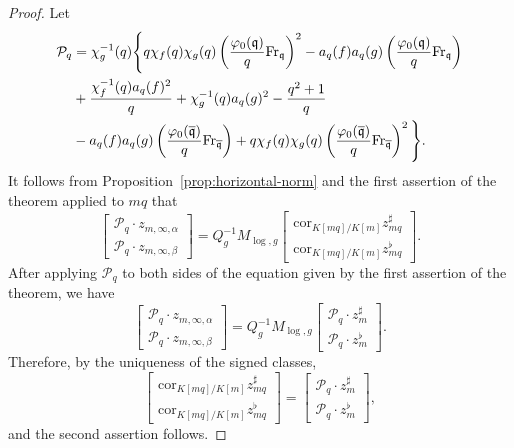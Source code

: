 \documentclass{amsart}
\numberwithin{equation}{section}
\newcommand{\frk}{\mathfrak}
\newcommand{\cP}{\mathcal{P}}
\newcommand{\cor}{\mathrm{cor}}
\newcommand{\Fr}{{\rm Fr}}
\begin{document}
\begin{proof}
    Let
     \begin{align*}
        \cP_q &= \chi_g^{-1}(q)\Bigg\{ q\chi_f(q)\chi_g(q) \left(\frac{\varphi_0(\frk{q})}{q}\Fr_{\frk{q}}\right)^2 -a_q(f)a_q(g) \left(\frac{\varphi_0(\frk{q})}{q}\Fr_{\frk{q}}\right) \\
        & +\frac{\chi_f^{-1}(q)a_q(f)^2}{q}+ \chi_{g}^{-1}(q)a_{q}(g)^2-\frac{q^2+1}{q} \\
        &-a_q(f)a_q(g) \left(\frac{\varphi_0(\overline{\frk{q}})}{q}\Fr_{\overline{\frk{q}}}\right) +q\chi_f(q)\chi_g(q) \left(\frac{\varphi_0(\overline{\frk{q}})}{q}\Fr_{\overline{\frk{q}}}\right)^2 \Bigg\} .
    \end{align*}
    It follows from Proposition~\ref{prop:horizontal-norm} and  the first assertion of the theorem applied to $mq$ that
     \[
    \begin{bmatrix}
      \cP_q\cdot z_{m,\infty,\alpha}\\   \cP_q  \cdot z_{m,\infty,\beta}\end{bmatrix}=Q_g^{-1}M_{\log,g}
\begin{bmatrix}
       \cor_{K[mq]/K[m]}z_{mq}^\sharp\\\cor_{K[mq]/K[m]}  z_{mq}^\flat
\end{bmatrix}    .
    \]
After applying $\cP_q$ to both sides of the equation given by the first assertion of the theorem, we have
      \[
    \begin{bmatrix}
      \cP_q\cdot z_{m,\infty,\alpha}\\   \cP_q  \cdot z_{m,\infty,\beta}\end{bmatrix}=Q_g^{-1}M_{\log,g}
\begin{bmatrix}
       \cP_q\cdot z_{m}^\sharp\\\cP_q \cdot z_{m}^\flat
\end{bmatrix}    .
    \]
    Therefore, by the uniqueness of the signed classes, 
    \[
    \begin{bmatrix}
       \cor_{K[mq]/K[m]}z_{mq}^\sharp\\\cor_{K[mq]/K[m]}  z_{mq}^\flat
\end{bmatrix}   = \begin{bmatrix}
       \cP_q\cdot z_{m}^\sharp\\\cP_q \cdot z_{m}^\flat
\end{bmatrix} ,
    \]
        and the second assertion follows.
\end{proof}
\end{document}
